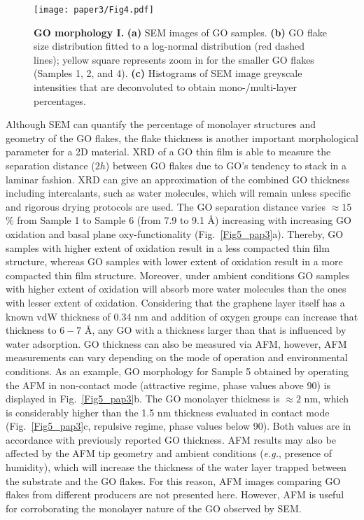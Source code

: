 \begin{figure}
  \centering
  \texttt{[image: paper3/Fig4.pdf]}
  \caption{\textbf{GO morphology I.} \textbf{(a)} SEM images of GO samples. \textbf{(b)} GO flake size distribution fitted to a log-normal distribution (red dashed lines); yellow square represents zoom in for the smaller GO flakes (Samples 1, 2, and 4). \textbf{(c)} Histograms of SEM image greyscale intensities that are deconvoluted to obtain mono-/multi-layer percentages.}
  \label{Fig4_pap3}
\end{figure}
Although SEM can quantify the percentage of monolayer structures and geometry of the GO flakes, the flake thickness is another important morphological parameter for a 2D material. XRD of a GO thin film is able to measure the separation distance ($2h$) between GO flakes due to GO's tendency to stack in a laminar fashion. XRD can give an approximation of the combined GO thickness including intercalants, such as water molecules, which will remain unless specific and rigorous drying protocols are used. The GO separation distance varies $\approx15$\% from Sample 1 to Sample 6 (from 7.9 to 9.1 {\AA}) increasing with increasing GO oxidation and basal plane oxy-functionality (Fig.~\ref{Fig5_pap3}a). Thereby, GO samples with higher extent of oxidation result in a less compacted thin film structure, whereas GO samples with lower extent of oxidation result in a more compacted thin film structure. Moreover, under ambient conditions GO samples with higher extent of oxidation will absorb more water molecules than the ones with lesser extent of oxidation. Considering that the graphene layer itself has a known vdW thickness of 0.34 nm and addition of oxygen groups can increase that thickness to $6-7$ {\AA}, any GO with a thickness larger than that is influenced by water adsorption. GO thickness can also be measured via AFM, however, AFM measurements can vary depending on the mode of operation and environmental conditions. As an example, GO morphology for Sample 5 obtained by operating the AFM in non-contact mode\cite{san2002unifying} (attractive regime, phase values above 90\textdegree) is displayed in Fig.~\ref{Fig5_pap3}b. The GO monolayer thickness is $\approx2$ nm, which is considerably higher than the 1.5 nm thickness evaluated in contact mode\cite{san2002unifying} (Fig.~\ref{Fig5_pap3}c, repulsive regime, phase values below 90\textdegree). Both values are in accordance with previously reported GO thickness.\cite{stankovich2007synthesis} AFM results may also be affected by the AFM tip geometry and ambient conditions (\textit{e.g.}, presence of humidity),\cite{santos2012effects} which will increase the thickness of the water layer trapped between the substrate and the GO flakes.\cite{santos2012method} For this reason, AFM images comparing GO flakes from different producers are not presented here. However, AFM is useful for corroborating the monolayer nature of the GO observed by SEM.\\

